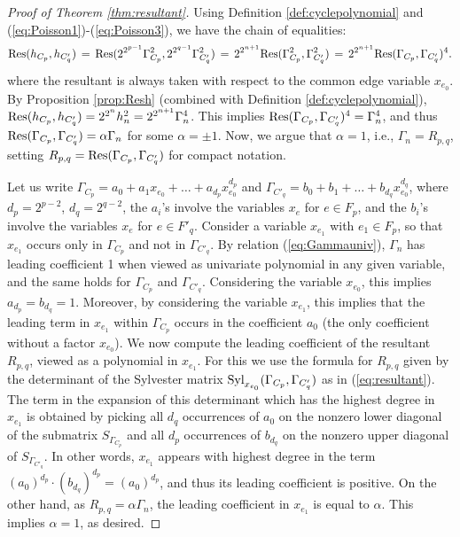 \documentclass[a4paper, 11pt, twoside]{article}
\theoremstyle{plain}
\begin{document}
\begin{proof}[Proof of Theorem \ref{thm:resultant}]
Using  Definition \ref{def:cyclepolynomial} and  (\ref{eq:Poisson1})-(\ref{eq:Poisson3}), we have the chain of equalities: 
\[ {\rm Res}(h_{C_p}, h_{C_q'}) \, = \, {\rm Res}(2^{2^{p-1}} \Gamma_{C_p}^2, 2^{2^{q-1}} \Gamma_{C_q'}^2) \, = \, 2^{2^{n+1}} {\rm Res}(\Gamma_{C_p}^2, \Gamma_{C_q'}^2) \, = \, 2^{2^{n+1}} {\rm Res}(\Gamma_{C_p}, \Gamma_{C_q'})^4.
\]
where the resultant is always taken with respect to the common edge variable $x_{e_0}$. 
By Proposition \ref{prop:Resh} (combined with Definition \ref{def:cyclepolynomial}), 
 ${\rm Res}(h_{C_p}, h_{C_q'})=2^{2^{n}}h_n^2=2^{2^{n+1}} \Gamma_n^4$. This implies 
 ${\rm Res}(\Gamma_{C_p}, \Gamma_{C_q'})^4 = \Gamma_n^4$, and thus ${\rm Res}(\Gamma_{C_p}, \Gamma_{C_q'})= \alpha \Gamma_n$ for some $\alpha=\pm 1$. 
 Now, we argue that $\alpha=1$, i.e., $\Gamma_n= R_{p,q}$, setting $R_{p,q}={\rm Res}(\Gamma_{C_p}, \Gamma_{C_q'})$ for compact notation.
  
Let us write $\Gamma_{C_p}= a_0+ a_1x_{e_0}+\ldots+ a_{d_p}x_{e_0}^{d_p}$ and  $\Gamma_{C'_q}= b_0+b_1+\ldots+b_{d_q}x_{e_0}^{d_q}$, where $d_p=2^{p-2}$, $d_q=2^{q-2}$, the $a_i$'s involve the variables $x_e$ for $e\in F_p$, and the $b_i$'s involve the variables $x_e$ for $e\in F'_q$.
 Consider a variable $x_{e_1}$ with $e_1\in F_p$, so that $x_{e_1}$ occurs only in $\Gamma_{C_p}$ and not in $\Gamma_{C'_q}$.  
 By relation (\ref{eq:Gammauniv}), $\Gamma_n$ has leading coefficient 1 when viewed as univariate polynomial in  any given variable, and the same holds for $\Gamma_{C_p}$ and $\Gamma_{C'_q}$. Considering the variable $x_{e_0}$,  this implies  $a_{d_p}=b_{d_q}=1$. Moreover, by considering the variable $x_{e_1}$, this implies that the leading term in $x_{e_1}$ within $\Gamma_{C_p}$ occurs in the coefficient $a_0$ (the only coefficient without a factor $x_{e_0}$).
We now compute the leading coefficient of the resultant $R_{p,q}$, viewed as a polynomial in $x_{e_1}$. For this we use the formula for $R_{p,q}$ given by the determinant of the Sylvester matrix $\text{\rm Syl}_{x_{e_0}}(\Gamma_{C_p},\Gamma_{C'_q})$ as in (\ref{eq:resultant}). The term in the expansion of this determinant which has the highest degree in $x_{e_1}$ is obtained by picking all $d_q$ occurrences of $a_0$ on the nonzero lower diagonal of the submatrix $S_{\Gamma_{C_p}}$ and all $d_p$ occurrences of $b_{d_q}$ on the nonzero upper diagonal of $S_{\Gamma_{C'_q}}$. 
In other words, $x_{e_1}$ appears with highest degree in the term 
$(a_0)^{d_p}\cdot (b_{d_q})^{d_p}=(a_0)^{d_p}$, and thus its leading coefficient is positive. 
On the other hand, as $R_{p,q}=\alpha \Gamma_n$, the leading coefficient in $x_{e_1}$ is equal to $\alpha$. This implies $\alpha=1$, as desired.
   \end{proof}
\end{document}
